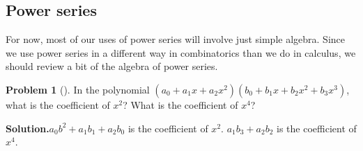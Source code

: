 \documentclass[10pt,]{book}
\theoremstyle{plain}
\theoremstyle{definition}
\newtheorem{activity}[project]{Problem}
\theoremstyle{definition}
\numberwithin{equation}{chapter}
\begin{document}
\subsection[{Power series}]{Power series}\label{subsection-36}
For now, most of our uses of power series will involve just simple algebra. Since we use power series in a different way in combinatorics than we do in calculus, we should review a bit of the algebra of power series.%
\begin{activity}[]\label{coeffinproduct}
In the polynomial \((a_0 +a_1x+a_2x^2)(b_0+b_1x+b_2x^2+b_3x^3)\), what is the coefficient of \(x^2\)? What is the coefficient of \(x^4\)?%
\par\medskip\noindent%
\textbf{Solution.}\quad \(a_0b^2+a_1b_1+a_2b_0\) is the coefficient of \(x^2\). \(a_1b_3+a_2b_2\) is the coefficient of \(x^4\).%
\end{activity}
\end{document}
